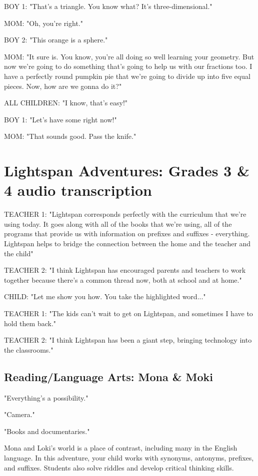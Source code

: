 BOY 1: "That's a triangle.
You know what?
It's three-dimensional."

MOM: "Oh, you're right."

BOY 2: "This orange is a sphere."

MOM: "It sure is.
You know, you're all doing so well learning your geometry.
But now we're going to do something that's going to help us with our fractions too.
I have a perfectly round pumpkin pie that we're going to divide up into five equal pieces.
Now, how are we gonna do it?"

ALL CHILDREN: "I know, that's easy!"

BOY 1: "Let's have some right now!"

MOM: "That sounds good. Pass the knife."

\section{Lightspan Adventures: Grades 3 \& 4 audio transcription}

TEACHER 1: "Lightspan corresponds perfectly with the curriculum that we're using today.
It goes along with all of the books that we're using, all of the programs that provide us with information on prefixes and suffixes - everything.
Lightspan helps to bridge the connection between the home and the teacher and the child"

TEACHER 2: "I think Lightspan has encouraged parents and teachers to work together because there's a common thread now, both at school and at home."

CHILD: "Let me show you how. You take the highlighted word..."

TEACHER 1: "The kids can't wait to get on Lightspan, and sometimes I have to hold them back."

TEACHER 2: "I think Lightspan has been a giant step, bringing technology into the classrooms."

\subsection{Reading/Language Arts: Mona \& Moki}

"Everything's a possibility."

"Camera."

"Books and documentaries."

Mona and Loki's world is a place of contrast, including many in the English language.
In this adventure, your child works with synonyms, antonyms, prefixes, and suffixes.
Students also solve riddles and develop critical thinking skills.

